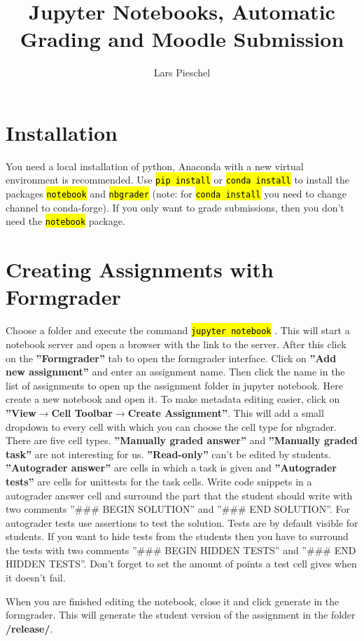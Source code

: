 \documentclass{article}
\title{Jupyter Notebooks, Automatic Grading and Moodle Submission}
\author{Lars Pieschel}
\newcommand{\consolecommand}[1]{
\begingroup%
  \sethlcolor{cmd}%
  \hl{\texttt{#1}}%
\endgroup}
\newcommand{\clickthis}[1]{\textbf{''#1''}}
\newcommand{\pathfmt}[1]{\textbf{#1}}
\begin{document}
	\maketitle
	\section{Installation}
		You need a local installation of python, Anaconda with a new virtual environment is recommended. Use \consolecommand{pip install} or \consolecommand{conda install} to install the packages \consolecommand{notebook} and \consolecommand{nbgrader} (note: for \consolecommand{conda install} you need to change channel to conda-forge). If you only want to grade submissions, then you don't need the \consolecommand{notebook} package.
	\section{Creating Assignments with Formgrader}
		Choose a folder and execute the command \consolecommand{jupyter notebook}. This will start a notebook server and open a browser with the link to the server. After this click on the \clickthis{Formgrader} tab to open the formgrader interface. Click on \clickthis{Add new assignment} and enter an assignment name. Then click the name in the list of assignments to open up the assignment folder in jupyter notebook. Here create a new notebook and open it. To make metadata editing easier, click on \clickthis{View$\rightarrow$Cell Toolbar$\rightarrow$Create Assignment}. This will add a small dropdown to every cell with which you can choose the cell type for nbgrader. There are five cell types. \clickthis{Manually graded answer} and \clickthis{Manually graded task} are not interesting for us. \clickthis{Read-only} can't be edited by students. \clickthis{Autograder answer} are cells in which a task is given and \clickthis{Autograder tests} are cells for unittests for the task cells. Write code snippets in a autograder answer cell and surround the part that the student should write with two comments ''\#\#\# BEGIN SOLUTION'' and ''\#\#\# END SOLUTION''. For autograder tests use assertions to test the solution. Tests are by default visible for students. If you want to hide tests from the students then you have to surround the tests with two comments ''\#\#\# BEGIN HIDDEN TESTS'' and ''\#\#\# END HIDDEN TESTS''. Don't forget to set the amount of points a test cell gives when it doesn't fail.

When you are finished editing the notebook, close it and click generate in the formgrader. This will generate the student version of the assignment in the folder \pathfmt{/release/}.
\end{document}
